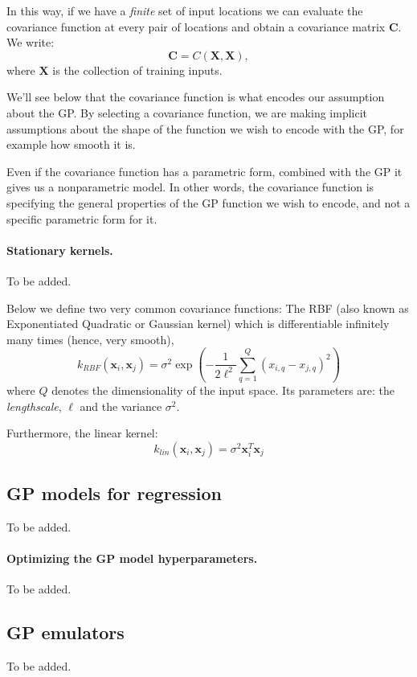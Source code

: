 \documentclass[%
oneside,                 %
final,                   %
10pt]{article}
\begin{document}
In this way, if we have a \emph{finite} set of input locations we can evaluate the covariance function at every pair of locations and obtain a covariance matrix $\mathbf{C}$. We write:
\[ \mathbf{C} = C(\mathbf{X}, \mathbf{X}), \]
where $\mathbf{X}$ is the collection of training inputs.

We'll see below that the covariance function is what encodes our assumption about the GP. By selecting a covariance function, we are making implicit assumptions about the shape of the function we wish to encode with the GP, for example how smooth it is.

Even if the covariance function has a parametric form, combined with the GP it gives us a nonparametric model. In other words, the covariance function is specifying the general properties of the GP function we wish to encode, and not a specific parametric form for it.


\paragraph{Stationary kernels.}
To be added.

Below we define two very common covariance functions: The RBF (also known as Exponentiated Quadratic or Gaussian kernel) which is differentiable infinitely many times (hence, very smooth),
\[ k_{RBF}(\mathbf{x}_{i},\mathbf{x}_{j}) = \sigma^2 \exp \left( -\frac{1}{2\ell^2} \sum_{q=1}^Q (x_{i,q} - x_{j,q})^2\right) \]
where $Q$ denotes the dimensionality of the input space. Its parameters are: the \emph{lengthscale}, $\ell$ and the variance $\sigma^2$. 

Furthermore, the linear kernel:
\[ k_{lin}(\mathbf{x}_{i},\mathbf{x}_{j}) = \sigma^2 \mathbf{x}_{i}^T \mathbf{x}_{j} \]

\subsection{GP models for regression}
To be added.

\paragraph{Optimizing the GP model hyperparameters.}
To be added.

\subsection{GP emulators}

To be added.


\end{document}
